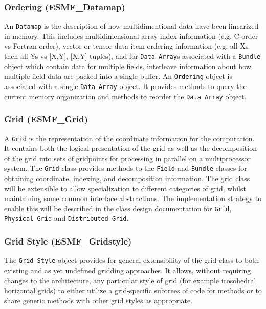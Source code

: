 \subsubsection{Ordering (ESMF\_Datamap)}
\label{sec:ordering} 
An {\tt Datamap} is the description of how multidimentional data have been
linearized in memory.  This includes multidimensional array index information (e.g. C-order
vs Fortran-order), vector or tensor data item ordering information (e.g. all Xs then all
Ys vs [X,Y], [X,Y] tuples), and for {\tt Data Array}s associated with a {\tt Bundle} object which contain
data for multiple fields, interleave information about how multiple field data are 
packed into a single buffer.
An {\tt Ordering} object is associated with a single {\tt Data Array} object.  It provides
methods to query the current memory organization and methods to reorder the 
{\tt Data Array} object.

\subsubsection{Grid (ESMF\_Grid)}
\label{sec:grid} 
A {\tt Grid} is the representation of the coordinate information for
the computation.  It contains both the logical presentation of the grid 
as well as the
decomposition of the grid into sets of gridpoints for processing in parallel on a
multiprocessor system.  The {\tt Grid} class provides methods to the
{\tt Field} and {\tt Bundle} classes for obtaining coordinate, indexing, and 
decomposition information. The grid class will be extensible 
to allow specialization to different categories of grid, whilst maintaining
some common interface abstractions. The implementation strategy to enable this
will be described in the class design documentation for {\tt Grid}, {\tt Physical Grid} and {\tt Distributed Grid}.

\subsubsection{Grid Style (ESMF\_Gridstyle)}
\label{sec:gridstyle} 
The {\tt Grid Style} object provides for general extensibility of the grid class to
both existing and as yet undefined gridding approaches. It allows, without requiring
changes to the architecture, any particular
style of grid (for example icosohedral horizontal grids) to either utilize a 
grid-specific subtrees of code for methods or to share generic methods with 
other grid styles as appropriate.

